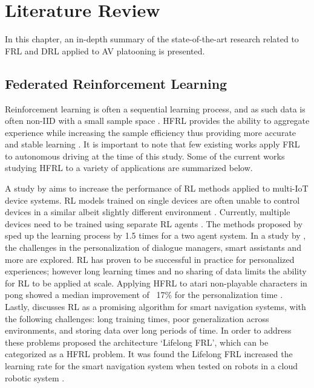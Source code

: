 \chapter{Literature Review} \label{chap:litreview}
In this chapter, an in-depth summary of the state-of-the-art research related to 
FRL and DRL applied to AV platooning is presented. 

\section{Federated Reinforcement Learning}

Reinforcement learning is often a sequential learning process, and as such data is often 
non-IID with a small sample space \cite{sutton2018reinforcement}.  HFRL provides the ability 
to aggregate experience while increasing the sample efficiency thus providing more accurate 
and stable learning  \cite{IntelAI19}. It is important to note that few existing works apply 
FRL to autonomous driving at the time of this study.  Some of the current works studying 
HFRL to a variety of applications are summarized below.

A study by \cite{Lim2020} aims to increase the performance of RL methods applied to 
multi-IoT device systems.  RL models trained on single devices are often unable to control 
devices in a similar albeit slightly different environment \cite{Lim2020}.  Currently, 
multiple devices need to be trained using separate RL agents \cite{Lim2020}. The methods 
proposed by \cite{Lim2020} sped up the learning process by 1.5 times for a two agent system. 
In a study by \cite{Nadiger2019}, the challenges in the personalization of dialogue 
managers, smart assistants and more are explored.  RL has proven to be successful in 
practice for personalized experiences; however long learning times and no sharing of data 
limits the ability for RL to be applied at scale.  Applying HFRL to atari non-playable 
characters in pong showed a median improvement of ~17\% for the personalization time 
\cite{Nadiger2019}. Lastly, \cite{Liu2019b} discusses RL as a promising algorithm for 
smart navigation systems, with the following challenges: long training times, poor 
generalization across environments, and storing data over long periods of time.  In order 
to address these problems \cite{Liu2019b} proposed the architecture `Lifelong FRL', 
which can be categorized as a HFRL problem.  It was found the Lifelong FRL increased 
the learning rate for the smart navigation system when tested on robots in a cloud 
robotic system \cite{Liu2019b}.  


